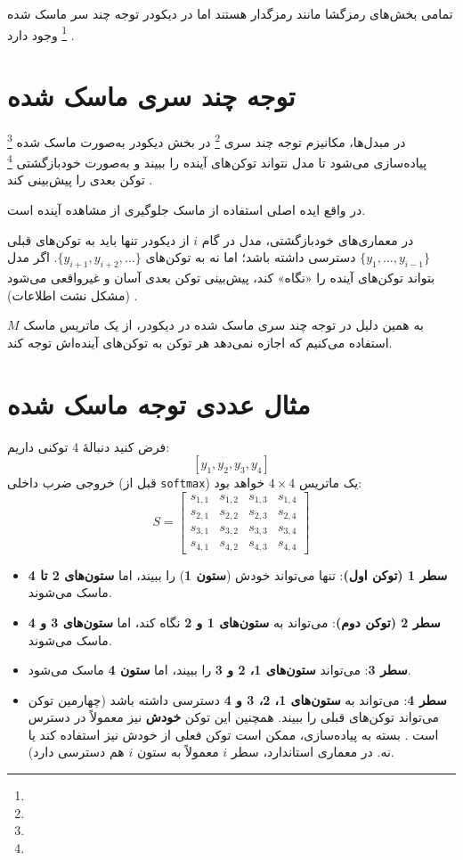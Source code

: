 تمامی بخش‌های رمزگشا مانند رمزگدار هستند اما در دیکودر توجه چند سر ماسک شده \footnote{} وجود دارد \cite{vaswani2017attention}.



\section{توجه  چند سری ماسک شده}
در مبدل‌ها، مکانیزم توجه چند سری \footnote{} در بخش دیکودر به‌صورت ماسک شده \footnote{} پیاده‌سازی می‌شود تا مدل نتواند توکن‌های آینده را ببیند و به‌صورت خودبازگشتی \footnote{} توکن بعدی را پیش‌بینی کند \cite{vaswani2017attention}.


در واقع ایده اصلی استفاده از ماسک جلوگیری از مشاهده آینده است.

در معماری‌های خودبازگشتی، مدل در گام \( i \) از دیکودر تنها باید به توکن‌های قبلی \( \{ y_1, \dots, y_{i-1} \} \) دسترسی داشته باشد؛ اما نه به توکن‌های \( \{ y_{i+1}, y_{i+2}, \dots \} \). اگر مدل بتواند توکن‌های آینده را «نگاه» کند، پیش‌بینی توکن بعدی آسان و غیرواقعی می‌شود (مشکل نشت اطلاعات) \cite{bahdanau2014neural,sutskever2014sequence}.

به همین دلیل در توجه چند سری ماسک شده در  دیکودر، از یک ماتریس ماسک \( M \) استفاده می‌کنیم که اجازه نمی‌دهد هر توکن به توکن‌های آینده‌اش توجه کند.

\section{مثال عددی توجه ماسک شده}
فرض کنید دنبالهٔ 4 توکنی داریم:
\[
[y_1, y_2, y_3, y_4]
\]
خروجی ضرب داخلی  (قبل از \texttt{softmax}) یک ماتریس \(4 \times 4\) خواهد بود:
\[
S =
\begin{bmatrix}
	s_{1,1} & s_{1,2} & s_{1,3} & s_{1,4} \\
	s_{2,1} & s_{2,2} & s_{2,3} & s_{2,4} \\
	s_{3,1} & s_{3,2} & s_{3,3} & s_{3,4} \\
	s_{4,1} & s_{4,2} & s_{4,3} & s_{4,4}
\end{bmatrix}
\]

\begin{itemize}
	\item \textbf{سطر 1 (توکن اول)}: تنها می‌تواند خودش (\textbf{ستون 1}) را ببیند، اما \textbf{ستون‌های 2 تا 4} ماسک می‌شوند.
	\item \textbf{سطر 2 (توکن دوم)}: می‌تواند به \textbf{ستون‌های 1 و 2} نگاه کند، اما \textbf{ستون‌های 3 و 4} ماسک می‌شوند.
	\item \textbf{سطر 3}: می‌تواند \textbf{ستون‌های 1، 2 و 3} را ببیند، اما \textbf{ستون 4} ماسک می‌شود.
	\item \textbf{سطر 4}: می‌تواند به \textbf{ستون‌های 1، 2، 3 و 4} دسترسی داشته باشد (چهارمین توکن می‌تواند توکن‌های قبلی را ببیند. همچنین این توکن \textbf{خودش} نیز معمولاً در دسترس است . بسته به پیاده‌سازی، ممکن است توکن فعلی از خودش نیز استفاده کند یا نه. در معماری استاندارد، سطر \( i \) معمولاً به ستون \( i \) هم دسترسی دارد).
\end{itemize}

